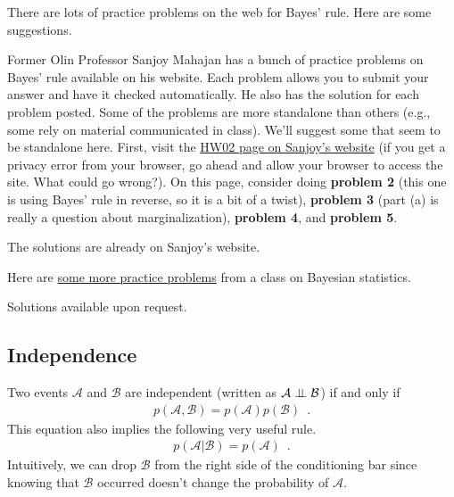 \documentclass[review_Solutions]{subfiles}
\begin{document}
\begin{exercise}
There are lots of practice problems on the web for Bayes' rule.  Here are some suggestions.
\bes
\item Former Olin Professor Sanjoy Mahajan has a bunch of practice problems on Bayes' rule available on his website.  Each problem allows you to submit your answer and have it checked automatically.  He also has the solution for each problem posted.  Some of the problems are more standalone than others (e.g., some rely on material communicated in class).  We'll suggest some that seem to be standalone here.  First, visit the \href{https://tutor.sanjoymahajan.org/bayes/hw02}{HW02 page on Sanjoy's website} (if you get a privacy error from your browser, go ahead and allow your browser to access the site.  What could go wrong?).  On this page, consider doing \textbf{problem 2} (this one is using Bayes' rule in reverse, so it is a bit of a twist), \textbf{problem 3} (part (a) is really a question about marginalization), \textbf{problem 4}, and \textbf{problem 5}.
\begin{boxedsolution}
The solutions are already on Sanjoy's website.
\end{boxedsolution}
\item Here are \href{http://www2.stat.duke.edu/~jerry/sta101/extraproblems/bayesian.htm}{some more practice problems} from a class on Bayesian statistics.
\begin{boxedsolution}
Solutions available upon request.
\end{boxedsolution}
\ees
\end{exercise}


\subsection{Independence}

Two events $\mathcal{A}$ and $\mathcal{B}$ are independent (written as $\mathcal{A} \perp\!\!\!\perp \mathcal{B}$) if and only if
\begin{align}
p(\mathcal{A}, \mathcal{B}) = p(\mathcal{A}) p(\mathcal{B}) \enspace .
\end{align}
This equation also implies the following very useful rule.
\begin{align}
p(\mathcal{A} | \mathcal{B}) = p(\mathcal{A}) \enspace .
\end{align}
Intuitively, we can drop $\mathcal{B}$ from the right side of the conditioning bar since knowing that $\mathcal{B}$ occurred doesn't change the probability of $\mathcal{A}$.
\end{document}
